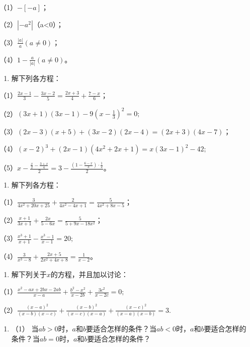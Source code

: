 （1）\(-[-a]\)；

（2）\(\left|-a^{2}\right|\)（a\textless0）；

（3）\(\frac{|a|}{a} (a \neq 0)\)；

（4）\(1 - \frac{a}{|a|} (a \neq 0)\)。

\begin{enumerate}[start=5]
\item
  解下列各方程：
\end{enumerate}

（1）\(\frac{2x - 1}{3} - \frac{3x - 2}{5} = \frac{2x + 3}{4} + \frac{7 - x}{6}\)；

（2）\((3x + 1)(3x - 1) - 9\left(x - \frac{1}{3}\right)^2 = 0;\)

（3）\((2x - 3)(x + 5) + (3x - 2)(2x - 4) = (2x + 3)(4x - 7)\)；

（4）\((x - 2)^{3} + (2x - 1)(4x^{2} + 2x + 1) = x(3x - 1)^{2} - 42;\)

（5）\(x - \frac{\frac{x}{2} - \frac{3 + x}{4}}{2} = 3 - \frac{\left(1 - \frac{6 - x}{3}\right) \cdot \frac{1}{2}}{2}\)。

\begin{enumerate}[start=6]
\item
  解下列各方程：
\end{enumerate}

（1）\(\frac{3}{4x^2 + 20x + 25} + \frac{2}{4x^2 - 4x + 1} = \frac{5}{4x^2 + 8x - 5}\)；

（2）\(\frac{x + 1}{3x + 1} + \frac{2x}{5 - 6x} = \frac{5}{5 + 9x - 18x^2}\)；

（3）\(\frac{x^3 + 1}{x + 1} - \frac{x^3 - 1}{x - 1} = 20;\)

（4）\(\frac{3}{x^3 - 8} + \frac{2x + 5}{2x^2 + 4x + 8} = \frac{1}{x - 2}\)。

\begin{enumerate}[start=7]
\item
  解下列关于\(x\)的方程，并且加以讨论：
\end{enumerate}

（1）\(\frac{x^2 - ax + 2bx - 2ab}{x - a} + \frac{b^2 - x^2}{x - 2b} + \frac{3c^2}{x - 2c} = 0;\)

（2）\(\frac{(x - a)^2}{(x - b)(x - c)} + \frac{(x - b)^2}{(x - c)(x - a)} + \frac{(x - c)^2}{(x - a)(x - b)} = 3.\)

\begin{enumerate}[start=8]
\item
  （1）
  当\(ab > 0\)时，\(a\)和\(b\)要适合怎样的条件？当\(ab < 0\)时，\(a\)和\(b\)要适合怎样的条件？当\(ab = 0\)时，\(a\)和\(b\)要适合怎样的条件？
\end{enumerate}

